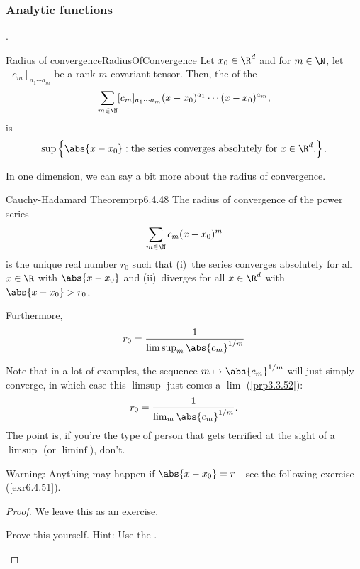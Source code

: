 \subsubsection{Analytic functions}
.
\begin{dfn}{Radius of convergence}{RadiusOfConvergence}
Let $x_0\in \R ^d$ and for $m\in \N$, let $[c_m]_{a_1\cdots a_m}$ be a rank $m$ covariant tensor.  Then, the  of the 
\begin{equation}
\sum _{m\in \N}[c_m]_{a_1\cdots a_m}(x-x_0)^{a_1}\cdots (x-x_0)^{a_m},
\end{equation}
is
\begin{equation*}
\sup \left\{ \abs{x-x_0}:\text{the series converges absolutely for }x\in \R ^d\text{.}\right\} .
\end{equation*}
\end{dfn}
In one dimension, we can say a bit more about the radius of convergence.
\begin{prp}{Cauchy-Hadamard Theorem}{prp6.4.48}
The radius of convergence of the power series
\begin{equation}
\sum _{m\in \N}c_m(x-x_0)^m
\end{equation}
is the unique real number $r_0$ such that (i)~the series converges absolutely for all $x\in \R$ with $\abs{x-x_0}$ and (ii)~diverges for all $x\in \R ^d$ with $\abs{x-x_0}>r_0$.

Furthermore,
\begin{equation}
r_0=\frac{1}{\limsup _m\abs{c_m}^{1/m}}
\end{equation}
\begin{rmk}
Note that in a lot of examples, the sequence $m\mapsto \abs{c_m}^{1/m}$ will just simply converge, in which case this $\limsup$ just comes a $\lim$ (\cref{prp3.3.52}):
\begin{equation}
r_0=\frac{1}{\lim _m\abs{c_m}^{1/m}}.
\end{equation}
The point is, if you're the type of person that gets terrified at the sight of a $\limsup$ (or $\liminf$), don't.
\end{rmk}
\begin{wrn}
Warning:  Anything may happen if $\abs{x-x_0}=r$---see the following exercise (\cref{exr6.4.51}).
\end{wrn}
\begin{proof}
We leave this as an exercise.
\begin{exr}[breakable=false]{}{}
Prove this yourself.  Hint:  Use the .
\end{exr}
\end{proof}
\end{prp}
